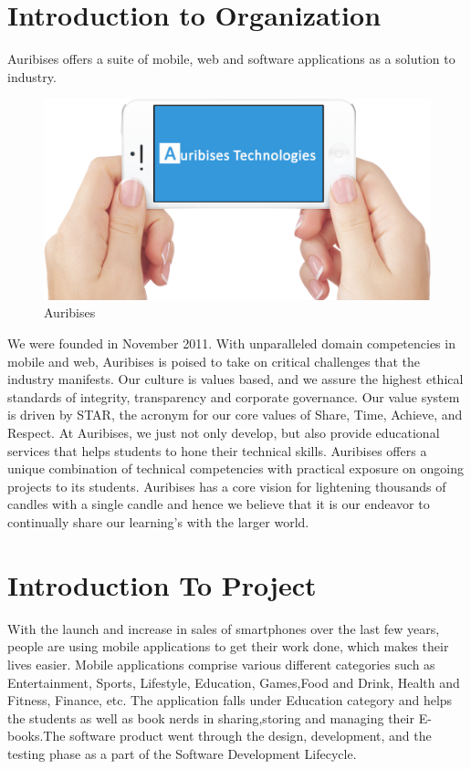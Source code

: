 \section{Introduction to Organization}
Auribises offers a suite of mobile, web and software applications as a solution to industry.
\begin{figure}[ht]
\centering
\includegraphics[scale=0.3]{images/aur.png}
\caption{Auribises}
\end{figure} 
We were founded in November 2011. With unparalleled domain competencies in mobile and web, Auribises is poised to take on critical challenges that the industry manifests. Our culture is values based, and we assure the highest ethical standards of integrity, transparency and corporate governance. Our value system is driven by STAR, the acronym for our core values of Share, Time, Achieve, and Respect. At Auribises, we just not only develop, but also provide educational services that helps students to hone their technical skills. Auribises offers a unique combination of technical competencies with practical exposure on ongoing projects to its students. Auribises has a core vision for lightening thousands of candles with a single candle and hence we believe that it is our endeavor to continually share our learning’s with the larger world.
\section{Introduction To Project} 
With the launch and increase in sales of smartphones over the last few years, people are using
mobile applications to get their work done, which makes their lives easier. Mobile applications
comprise various different categories such as Entertainment, Sports, Lifestyle, Education, Games,Food and Drink, Health and Fitness, Finance, etc. The application falls under Education category and helps the students as well as book nerds in sharing,storing and managing
their E-books.The software product went through the design, development, and the testing
phase as a part of the Software Development Lifecycle.

